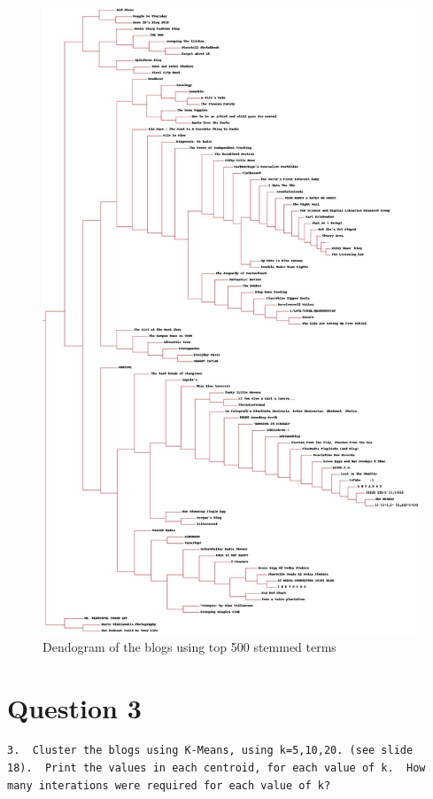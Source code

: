 \documentclass[letterpaper,10pt]{article}
\begin{document}
\newpage
\begin{figure}[h]
\includegraphics[scale=0.26]{datafiles/blogtop500stemmed_deno.jpg}
\caption{Dendogram of the blogs using top 500 stemmed terms}
\label{fig:q2stemdeno}
\end{figure}
\newpage
   

\section*{Question 3}
\begin{verbatim}
3.  Cluster the blogs using K-Means, using k=5,10,20. (see slide
18).  Print the values in each centroid, for each value of k.  How
many interations were required for each value of k?
\end{verbatim}
\end{document}
